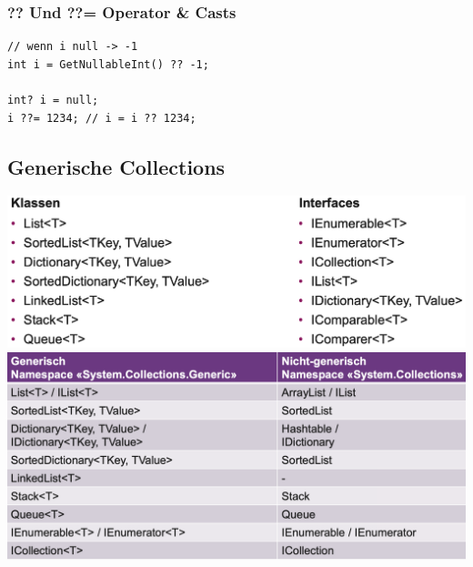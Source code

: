 \subsubsection{?? Und ??= Operator \& Casts}

\begin{lstlisting}
// wenn i null -> -1
int i = GetNullableInt() ?? -1;

int? i = null;
i ??= 1234; // i = i ?? 1234;

\end{lstlisting}


\subsection{Generische Collections}
\begin{center}
    \includegraphics[scale=.24]{graphic/generics/Generische Listentypen.png}
    \includegraphics[scale=.24]{graphic/generics/Nicht-generische Pendants.png}
\end{center}

\newpage